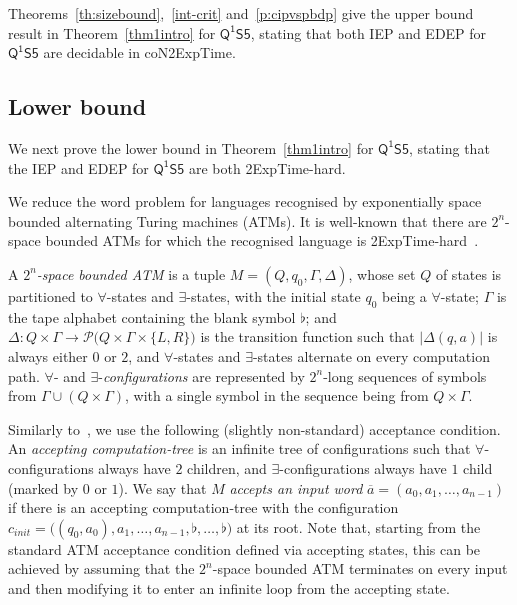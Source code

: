 \documentclass[10pt,a4paper]{amsart}
\theoremstyle{plain}
\newtheorem{definition}[thm]{Definition}
\theoremstyle{definition}
\newcommand{\FOMS}{\ensuremath{\mathsf{Q^1S5}}}
\newcommand{\blank}{\flat}
\newcommand{\inpw}{\overline{a}}
\newcommand{\inpww}{a}
\newcommand{\cinit}{\config_{\textit{init}}}
\newcommand{\config}{c}
\begin{document}
Theorems~\ref{th:sizebound},~\ref{int-crit} and~\ref{p:cipvspbdp} give the upper bound result in Theorem~\ref{thm1intro} for $\FOMS$, stating that both IEP and EDEP for $\FOMS$ are decidable in {\sc coN2ExpTime}. 


\subsection{Lower bound}\label{ssec:s5xs5low}
We next prove the lower bound in Theorem~\ref{thm1intro} for $\FOMS$, stating that the IEP and EDEP for $\FOMS$ are both {\sc 2ExpTime}-hard. 

We reduce the word problem for languages recognised by exponentially space bounded alternating Turing machines (ATMs).
It is well-known that there are $2^n$-space bounded ATMs for which the recognised language is {\sc 2ExpTime}-hard~\cite{chandraAlternation1981}.
	
	A \emph{$2^n$-space bounded ATM} is a tuple $M=(Q,q_0,\Gamma,\Delta)$, 
	whose set $Q$ of states is partitioned to $\forall$-states and $\exists$-states, with the initial state $q_0$ being a $\forall$-state;
	$\Gamma$ is the tape alphabet containing the blank symbol $\blank$; 
	and 
	$
	\Delta \colon Q\times\Gamma\to\mathcal{P}\bigl(Q\times\Gamma\times\{L,R\}\bigr)
	$ 
	is the
	transition function such that $|\Delta(q,a)|$ is always either $0$ or $2$, and 
	$\forall$-states and $\exists$-states alternate on every computation path.
	$\forall$- and $\exists$-\emph{configurations} are represented by $2^n$-long sequences of symbols from $\Gamma\cup(Q\times\Gamma)$,
	with a single symbol in the sequence being from $Q\times\Gamma$.
	
	Similarly to~\cite{DBLP:conf/lics/JungW21},
	we use the following (slightly non-standard) acceptance condition.
	An \emph{accepting computation-tree} is an infinite tree of configurations such that $\forall$-configurations always have $2$ children, and $\exists$-configurations always have $1$ child (marked by $0$ or $1$).
	We say that $M$ \emph{accepts an input word} $\inpw=(\inpww_0,\inpww_1,\dots,\inpww_{n-1})$ if there
	is an accepting computation-tree with the configuration 
	$
	\cinit=\bigl((q_0,\inpww_0),\inpww_1,\dots,\inpww_{n-1},\blank,\dots,\blank\bigr)
	$
	at its root.
	Note that, starting from the standard ATM acceptance condition defined via accepting states, this can be achieved by assuming that the $2^n$-space bounded ATM terminates on every input and then modifying it to enter an infinite loop from the accepting state. 
	
\end{document}
